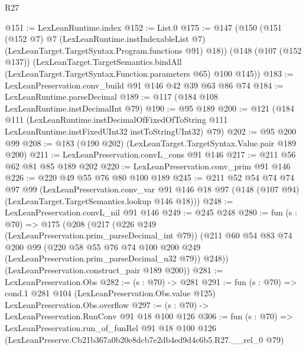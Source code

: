 \begin{lexlean}{R27}
\begin{coremodule}
@151 := LexLeanRuntime.index
@152 := List.{0}
@175 := @147
    (@150
      (@151
        (@152 @7)
        @7
        (LexLeanRuntime.instIndexableList @7)
        (LexLeanTarget.TargetSyntax.Program.functions @91)
        @18))
    (@148
      (@107 (@152 @137))
      (LexLeanTarget.TargetSemantics.bindAll
        (LexLeanTarget.TargetSyntax.Function.parameters @65)
        @100
        @145))
@183 := LexLeanPreservation.conv_build @91 @146 @42 @39 @63 @86 @74
@184 := LexLeanRuntime.parseDecimal
@189 := @117 (@184 @108 LexLeanRuntime.instDecimalInt @79)
@190 := @95 @189
@200 := @121
    (@184
      @111
      (LexLeanRuntime.instDecimalOfFixedOfToString
        @111
        LexLeanRuntime.instFixedUInt32
        instToStringUInt32)
      @79)
@202 := @95 @200 @99
@208 := @183 (@190 @202) (LexLeanTarget.TargetSyntax.Value.pair @189 @200)
@211 := LexLeanPreservation.convL_cons @91 @146
@217 := @211 @56 @62 @81 @85 @189 @202
@220 := LexLeanPreservation.conv_prim @91 @146
@226 := @220 @49 @55 @76 @80 @100 @189
@245 := @211
    @52
    @54
    @74
    @74
    @97
    @99
    (LexLeanPreservation.conv_var
      @91
      @146
      @18
      @97
      (@148 (@107 @94) (LexLeanTarget.TargetSemantics.lookup @146 @18)))
@248 := LexLeanPreservation.convL_nil @91 @146
@249 := @245 @248
@280 := fun (s : @70) =>
  @175
    (@208
      (@217
        (@226 @249 (LexLeanPreservation.prim_parseDecimal_int @79))
        (@211
          @60
          @54
          @83
          @74
          @200
          @99
          (@220 @58 @55 @76 @74 @100 @200 @249 (LexLeanPreservation.prim_parseDecimal_u32 @79))
          @248))
      (LexLeanPreservation.construct_pair @189 @200))
@281 := LexLeanPreservation.Obs
@282 := (s : @70) -> @281
@291 := fun (s : @70) =>
  cond.{1} @281 @104 (LexLeanPreservation.Obs.value @125) LexLeanPreservation.Obs.overflow
@297 := (s : @70) -> LexLeanPreservation.RunConv @91 @18 @100 @126
@306 := fun (s : @70) =>
  LexLeanPreservation.run_of_funRel
    @91
    @18
    @100
    @126
    (LexLeanPreserve.Cb21b367a0b20e8dcb7e2db4ed9d4c6b5.R27.__rel_0 @79)
\end{coremodule}
\end{lexlean}
